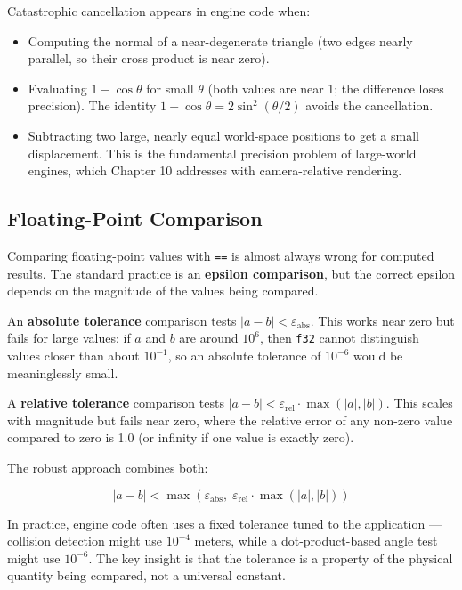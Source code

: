 \documentclass[
  11pt,
  letterpaper,
  DIV=11,
  numbers=noendperiod,
  twoside,
  open=right]{scrreprt}
\providecommand{\tightlist}{%
  \setlength{\itemsep}{0pt}\setlength{\parskip}{0pt}}
\begin{document}
Catastrophic cancellation appears in engine code when:

\begin{itemize}
\tightlist
\item
  Computing the normal of a near-degenerate triangle (two edges nearly
  parallel, so their cross product is near zero).
\item
  Evaluating \(1 - \cos\theta\) for small \(\theta\) (both values are
  near 1; the difference loses precision). The identity
  \(1 - \cos\theta = 2\sin^2(\theta/2)\) avoids the cancellation.
\item
  Subtracting two large, nearly equal world-space positions to get a
  small displacement. This is the fundamental precision problem of
  large-world engines, which Chapter 10 addresses with camera-relative
  rendering.
\end{itemize}

\subsection{Floating-Point Comparison}\label{floating-point-comparison}

Comparing floating-point values with \texttt{==} is almost always wrong
for computed results. The standard practice is an \textbf{epsilon
comparison}, but the correct epsilon depends on the magnitude of the
values being compared.

An \textbf{absolute tolerance} comparison tests
\(|a - b| < \varepsilon_{\text{abs}}\). This works near zero but fails
for large values: if \(a\) and \(b\) are around \(10^6\), then
\texttt{f32} cannot distinguish values closer than about \(10^{-1}\), so
an absolute tolerance of \(10^{-6}\) would be meaninglessly small.

A \textbf{relative tolerance} comparison tests
\(|a - b| < \varepsilon_{\text{rel}} \cdot \max(|a|, |b|)\). This scales
with magnitude but fails near zero, where the relative error of any
non-zero value compared to zero is 1.0 (or infinity if one value is
exactly zero).

The robust approach combines both:

\[
|a - b| < \max(\varepsilon_{\text{abs}}, \; \varepsilon_{\text{rel}} \cdot \max(|a|, |b|))
\]

In practice, engine code often uses a fixed tolerance tuned to the
application --- collision detection might use \(10^{-4}\) meters, while
a dot-product-based angle test might use \(10^{-6}\). The key insight is
that the tolerance is a property of the physical quantity being
compared, not a universal constant.
\end{document}
